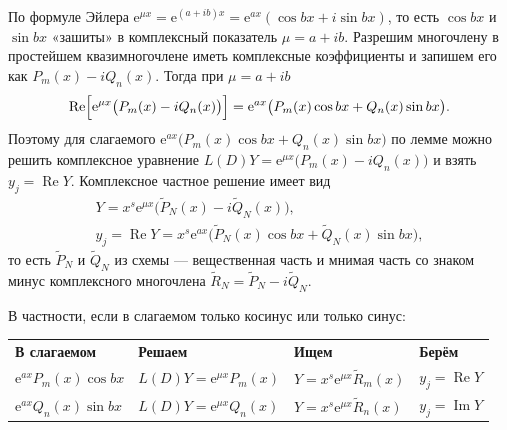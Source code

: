 \documentclass[12pt,a4paper]{article}
\numberwithin{equation}{section}
\renewcommand{\Re}{\operatorname{Re}}
\renewcommand{\Im}{\operatorname{Im}}
\newcommand{\e}{\mathrm{e}}
\begin{document}
\begin{remarkHSE}
По формуле Эйлера \(\e^{\mu x}=\e^{(a+ib)x}=\e^{ax}(\cos bx+i\sin bx)\), то есть \(\cos bx\) и \(\sin bx\) «зашиты» в комплексный показатель \(\mu=a+ib\). Разрешим многочлену в простейшем квазимногочлене иметь комплексные коэффициенты и запишем его как \(P_m(x)-iQ_n(x)\). Тогда при \(\mu=a+ib\)
\[
\Re\Bigl[\e^{\mu x}\bigl(P_m(x)-iQ_n(x)\bigr)\Bigr]=\e^{ax}\bigl(P_m(x)\cos bx+Q_n(x)\sin bx\bigr).
\]
Поэтому для слагаемого \(\e^{ax}\bigl(P_m(x)\cos bx+Q_n(x)\sin bx\bigr)\) по лемме можно решить комплексное уравнение \(L(D)Y=\e^{\mu x}\bigl(P_m(x)-iQ_n(x)\bigr)\) и взять \(y_j=\Re Y\). Комплексное частное решение имеет вид
\begin{gather*}
Y=x^s\e^{\mu x}\bigl(\tilde P_N(x)-i\tilde Q_N(x)\bigr),\\
y_j=\Re Y=x^s\e^{ax}\bigl(\tilde P_N(x)\cos bx+\tilde Q_N(x)\sin bx\bigr),
\end{gather*}
то есть \(\tilde P_N\) и \(\tilde Q_N\) из схемы --- вещественная часть и мнимая часть со знаком минус комплексного многочлена \(\tilde R_N=\tilde P_N-i\tilde Q_N\).

В частности, если в слагаемом только косинус или только синус:
\begin{center}
\renewcommand{\arraystretch}{1.3}
\begin{tabular}{llll}
\textbf{В слагаемом} & \textbf{Решаем} & \textbf{Ищем} & \textbf{Берём}\\
\(\e^{ax}P_m(x)\cos bx\) & \(L(D)Y=\e^{\mu x}P_m(x)\) & \(Y=x^s\e^{\mu x}\tilde R_m(x)\) & \(y_j=\Re Y\)\\
\(\e^{ax}Q_n(x)\sin bx\) & \(L(D)Y=\e^{\mu x}Q_n(x)\) & \(Y=x^s\e^{\mu x}\tilde R_n(x)\) & \(y_j=\Im Y\)
\end{tabular}
\end{center}
\end{remarkHSE}
\end{document}
